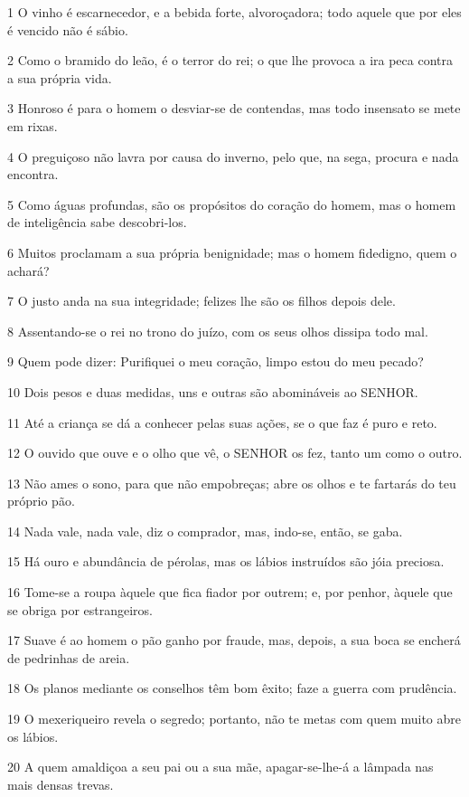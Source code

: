 \par 1 O vinho é escarnecedor, e a bebida forte, alvoroçadora; todo aquele que por eles é vencido não é sábio.
\par 2 Como o bramido do leão, é o terror do rei; o que lhe provoca a ira peca contra a sua própria vida.
\par 3 Honroso é para o homem o desviar-se de contendas, mas todo insensato se mete em rixas.
\par 4 O preguiçoso não lavra por causa do inverno, pelo que, na sega, procura e nada encontra.
\par 5 Como águas profundas, são os propósitos do coração do homem, mas o homem de inteligência sabe descobri-los.
\par 6 Muitos proclamam a sua própria benignidade; mas o homem fidedigno, quem o achará?
\par 7 O justo anda na sua integridade; felizes lhe são os filhos depois dele.
\par 8 Assentando-se o rei no trono do juízo, com os seus olhos dissipa todo mal.
\par 9 Quem pode dizer: Purifiquei o meu coração, limpo estou do meu pecado?
\par 10 Dois pesos e duas medidas, uns e outras são abomináveis ao SENHOR.
\par 11 Até a criança se dá a conhecer pelas suas ações, se o que faz é puro e reto.
\par 12 O ouvido que ouve e o olho que vê, o SENHOR os fez, tanto um como o outro.
\par 13 Não ames o sono, para que não empobreças; abre os olhos e te fartarás do teu próprio pão.
\par 14 Nada vale, nada vale, diz o comprador, mas, indo-se, então, se gaba.
\par 15 Há ouro e abundância de pérolas, mas os lábios instruídos são jóia preciosa.
\par 16 Tome-se a roupa àquele que fica fiador por outrem; e, por penhor, àquele que se obriga por estrangeiros.
\par 17 Suave é ao homem o pão ganho por fraude, mas, depois, a sua boca se encherá de pedrinhas de areia.
\par 18 Os planos mediante os conselhos têm bom êxito; faze a guerra com prudência.
\par 19 O mexeriqueiro revela o segredo; portanto, não te metas com quem muito abre os lábios.
\par 20 A quem amaldiçoa a seu pai ou a sua mãe, apagar-se-lhe-á a lâmpada nas mais densas trevas.
